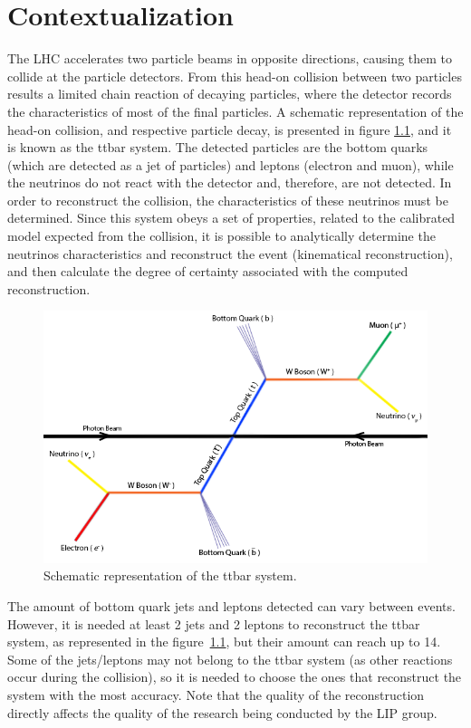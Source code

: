
\chapter{Contextualization}
\label{context}

The LHC accelerates two particle beams in opposite directions, causing them to collide at the particle detectors. From this head-on collision between two particles results a limited chain reaction of decaying particles, where the detector records the characteristics of most of the final particles. A schematic representation of the head-on collision, and respective particle decay, is presented in figure \ref{fig:ttbar}, and it is known as the ttbar system. The detected particles are the bottom quarks (which are detected as a jet of particles) and leptons (electron and muon), while the neutrinos do not react with the detector and, therefore, are not detected. In order to reconstruct the collision, the characteristics of these neutrinos must be determined. Since this system obeys a set of properties, related to the calibrated model expected from the collision, it is possible to analytically determine the neutrinos characteristics and reconstruct the event (kinematical reconstruction), and then calculate the degree of certainty associated with the computed reconstruction.

\begin{figure}[!htp]
	\begin{center}
		\includegraphics[scale=0.5]{../../common/img/ttbar.png}
		\caption{Schematic representation of the ttbar system.}
		\label{fig:ttbar}
	\end{center}
\end{figure}

The amount of bottom quark jets and leptons detected can vary between events. However, it is needed at least 2 jets and 2 leptons to reconstruct the ttbar system, as represented in the figure~\ref{fig:ttbar}, but their amount can reach up to 14. Some of the jets/leptons may not belong to the ttbar system (as other reactions occur during the collision), so it is needed to choose the ones that reconstruct the system with the most accuracy. Note that the quality of the reconstruction directly affects the quality of the research being conducted by the LIP group.

